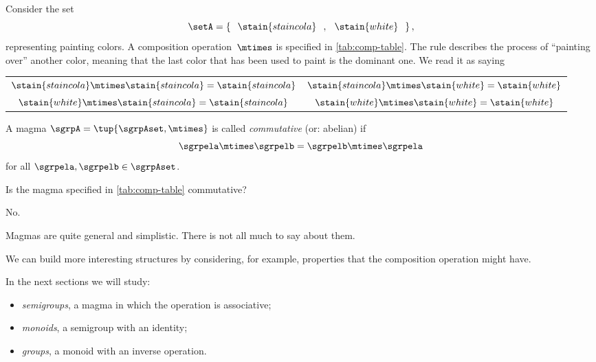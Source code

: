 \begin{example}
Consider the set
\begin{equation*}
    \setA = \left\{\hspace{0.25cm} \stain{staincola}\hspace{0.25cm},\hspace{0.25cm} \stain{white}\hspace{0.25cm}\right\},
\end{equation*}
representing painting colors.
A composition operation~$\mtimes$ is specified in \cref{tab:comp-table}.
The rule describes the process of ``painting over'' another color, meaning that the last color that has been used to paint is the dominant one.
We read it as saying
\begin{center}
    \setlength{\tabcolsep}{20pt}
    \begin{tabular}{cc}
        $\stain{staincola} \mtimes \stain{staincola} = \stain{staincola}$ & $\stain{staincola} \mtimes \stain{white} = \stain{white}$ \\
        $\stain{white} \mtimes \stain{staincola}     = \stain{staincola}$ & $\stain{white} \mtimes \stain{white} = \stain{white}$
    \end{tabular}
\end{center}
\end{example}

\begin{definition}
A magma $\sgrpA = \tup{\sgrpAset, \mtimes}$ is called \emph{commutative} (or: abelian) if
     \begin{equation}
                      \label{eq:semigroup-commutativity}
                      \sgrpela \mtimes   \sgrpelb = \sgrpelb \mtimes \sgrpela
     \end{equation}
for all $\sgrpela , \sgrpelb \in \sgrpAset$.
\end{definition}

\begin{exercise}
Is the magma specified in \cref{tab:comp-table} commutative?
\end{exercise}
\begin{solution}
No.
\end{solution}

Magmas are quite general and simplistic.
There is not all much to say about them.

We can build more interesting structures by considering, for example, properties that the composition operation might have.

In the next sections we will study:

\begin{itemize}
    \item \emph{semigroups}, a magma in which the operation is associative;
    \item \emph{monoids}, a semigroup with an identity;
    \item \emph{groups}, a monoid with an inverse operation.
\end{itemize}
